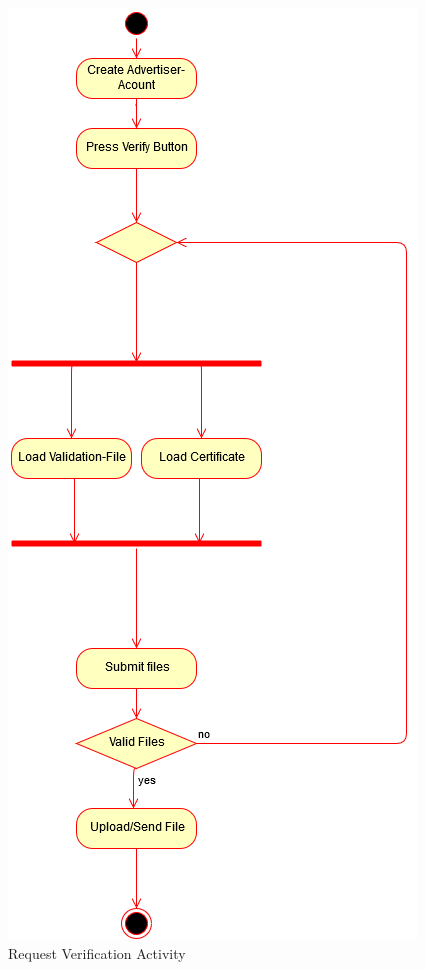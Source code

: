 \begin{center}
\begin{figure}[H]
\centering
\includegraphics[scale=0.5]{SystemSpec/Usecases/Diagrams/RequestVerificationActivity.png}
\caption{\label{fig:blue_rectangle}Request Verification Activity}
\end{figure}
\end{center}

